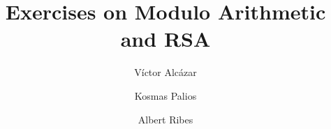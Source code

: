 

\title{Exercises on Modulo Arithmetic and RSA}
\author{
Víctor Alcázar
\and
Kosmas Palios
\and
Albert Ribes
}

\maketitle




